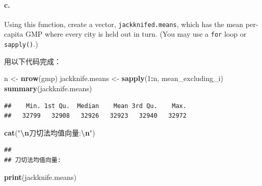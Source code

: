 \documentclass[
]{article}
\newenvironment{Shaded}{\begin{snugshade}}{\end{snugshade}}
\newcommand{\DecValTok}[1]{\textcolor[rgb]{0.00,0.00,0.81}{#1}}
\newcommand{\FunctionTok}[1]{\textcolor[rgb]{0.13,0.29,0.53}{\textbf{#1}}}
\newcommand{\NormalTok}[1]{#1}
\newcommand{\OtherTok}[1]{\textcolor[rgb]{0.56,0.35,0.01}{#1}}
\newcommand{\SpecialCharTok}[1]{\textcolor[rgb]{0.81,0.36,0.00}{\textbf{#1}}}
\newcommand{\StringTok}[1]{\textcolor[rgb]{0.31,0.60,0.02}{#1}}
\begin{document}
\paragraph{c.~}\label{c.}

Using this function, create a vector, \texttt{jackknifed.means}, which
has the mean per-capita GMP where every city is held out in turn. (You
may use a \texttt{for} loop or \texttt{sapply()}.)

用以下代码完成：

\begin{Shaded}
\begin{Highlighting}[]
\NormalTok{n }\OtherTok{\textless{}{-}} \FunctionTok{nrow}\NormalTok{(gmp)}
\NormalTok{jackknife.means }\OtherTok{\textless{}{-}} \FunctionTok{sapply}\NormalTok{(}\DecValTok{1}\SpecialCharTok{:}\NormalTok{n, mean\_excluding\_i)}
\FunctionTok{summary}\NormalTok{(jackknife.means)}
\end{Highlighting}
\end{Shaded}

\begin{verbatim}
##    Min. 1st Qu.  Median    Mean 3rd Qu.    Max. 
##   32799   32908   32926   32923   32940   32972
\end{verbatim}

\begin{Shaded}
\begin{Highlighting}[]
\FunctionTok{cat}\NormalTok{(}\StringTok{"}\SpecialCharTok{\textbackslash{}n}\StringTok{刀切法均值向量:}\SpecialCharTok{\textbackslash{}n}\StringTok{"}\NormalTok{)}
\end{Highlighting}
\end{Shaded}

\begin{verbatim}
## 
## 刀切法均值向量:
\end{verbatim}

\begin{Shaded}
\begin{Highlighting}[]
\FunctionTok{print}\NormalTok{(jackknife.means)}
\end{Highlighting}
\end{Shaded}
\end{document}
